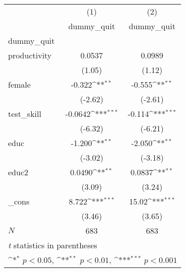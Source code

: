 {
\def\sym#1{\ifmmode^{#1}\else\(^{#1}\)\fi}
\begin{tabular}{l*{2}{c}}
\hline\hline
            &\multicolumn{1}{c}{(1)}&\multicolumn{1}{c}{(2)}\\
            &\multicolumn{1}{c}{dummy\_quit}&\multicolumn{1}{c}{dummy\_quit}\\
\hline
dummy\_quit  &                     &                     \\
productivity&      0.0537         &      0.0989         \\
            &      (1.05)         &      (1.12)         \\
[1em]
female      &      -0.322\sym{**} &      -0.555\sym{**} \\
            &     (-2.62)         &     (-2.61)         \\
[1em]
test\_skill  &     -0.0642\sym{***}&      -0.114\sym{***}\\
            &     (-6.32)         &     (-6.21)         \\
[1em]
educ        &      -1.200\sym{**} &      -2.050\sym{**} \\
            &     (-3.02)         &     (-3.18)         \\
[1em]
educ2       &      0.0490\sym{**} &      0.0837\sym{**} \\
            &      (3.09)         &      (3.24)         \\
[1em]
\_cons      &       8.722\sym{***}&       15.02\sym{***}\\
            &      (3.46)         &      (3.65)         \\
\hline
\(N\)       &         683         &         683         \\
\hline\hline
\multicolumn{3}{l}{\footnotesize \textit{t} statistics in parentheses}\\
\multicolumn{3}{l}{\footnotesize \sym{*} \(p<0.05\), \sym{**} \(p<0.01\), \sym{***} \(p<0.001\)}\\
\end{tabular}
}
